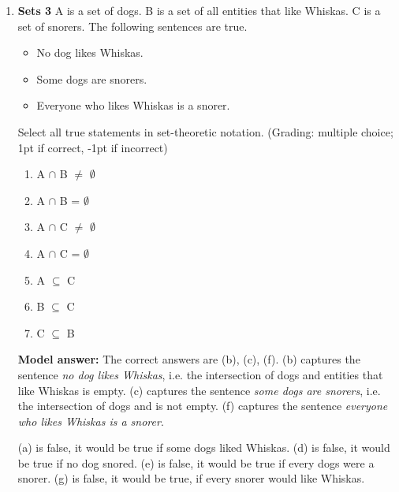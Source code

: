 \documentclass[a4,11pt]{article}
\begin{document}
\begin{enumerate}[leftmargin = 12pt]
        \begin{enumerate}[noitemsep]
        \item A $\cap$ B = $\emptyset$ (-1pt checked / 1pt unchecked)
	\item A $\cup$ B = $\emptyset$  (-1pt checked / 1pt unchecked)
        \item A $\subset$ B (1pt checked / -1pt unchecked)
	\end{enumerate}	

{\bf Model answer:}  The correct answer is  A $\subset$ B because every member of the set of parrots is a member of the set of entities who like to sing.

\item {\bf Sets 3}  A is a set of dogs. B is a set of all entities that like Whiskas. C is a set of snorers. The following sentences are true. 

\begin{itemize}[noitemsep]
\item No dog likes Whiskas.
\item Some dogs are snorers.
\item Everyone who likes Whiskas is a snorer.
\end{itemize}

Select all true statements in set-theoretic notation. (Grading: multiple choice; 1pt if correct, -1pt if incorrect)

\begin{enumerate}
\item A $\cap$ B $\neq$ $\emptyset$
\item A $\cap$ B = $\emptyset$
\item A $\cap$ C $\neq$ $\emptyset$
\item A $\cap$ C = $\emptyset$
\item A $\subseteq$ C 
\item B $\subseteq$ C 
\item C $\subseteq$ B
\end{enumerate}

{\bf Model answer:} The correct answers are (b), (c), (f). (b) captures the sentence \textit{no dog likes Whiskas}, i.e. the intersection of dogs and entities that like Whiskas is empty. (c) captures the sentence \textit{some dogs are snorers}, i.e. the intersection of dogs and is not empty. (f) captures the sentence \textit{everyone who likes Whiskas is a snorer}.

(a) is false, it would be true if some dogs liked Whiskas. 
(d) is false, it would be true if no dog snored. 
(e) is false, it would be true if every dogs were a snorer. 
(g) is false, it would be true, if every snorer would like Whiskas.



\end{enumerate}
\end{document}
